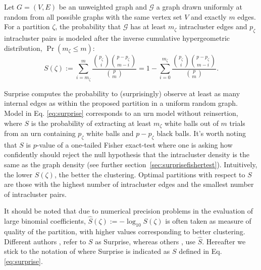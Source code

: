 Let $G=(V,E)$ be an unweighted graph and $\mathcal{G}$ a graph drawn uniformly at random from all possible graphs with the same vertex set $V$ and exactly $m$ edges. For a partition $\zeta$, the probability that $\mathcal{G}$ has at least $m_\zeta$ intracluster edges and $p_\zeta$ intracluster pairs is modeled after the inverse cumulative hypergeometric distribution, $\Pr( m_\zeta \leq m)$:
\begin{equation}\label{eq:surprise}
S(\zeta) := \sum_{i = m_\zeta}^m \dfrac{\binom{p_\zeta}{i} \binom{p-p_\zeta}{m-i} }{\binom{p}{m}} = 1- \sum_{i = 0}^{m_\zeta} \dfrac{\binom{p_\zeta}{i} \binom{p-p_\zeta}{m-i} }{\binom{p}{m}}.
\end{equation}

Surprise computes the probability to (surprisingly) observe at least as many internal edges as within the proposed partition in a uniform random graph. Model in Eq. \ref{eq:surprise}  corresponds to an urn model without reinsertion, where $S$ is the probability of extracting at least $m_\zeta$ white balls out of $m$ trials from an urn containing $p_\zeta$ white balls and $p-p_\zeta$ black balls. It's worth noting that $S$ is $p$-value of a one-tailed Fisher exact-test where one is asking how confidently should reject the null hypothesis that the intracluster density is the same as the graph density (see further section~\ref{sec:surprisefishertest}). Intuitively, the lower $S(\zeta)$, the better the clustering. Optimal partitions with respect to $S$ are those with the highest number of intracluster edges and the smallest number of intracluster pairs.

It should be noted that due to numerical precision problems in the evaluation of large binomial coefficients, $\hat{S}(\zeta) := -\log_{10}S(\zeta)$ is often taken as measure of quality of the partition, with higher values corresponding to better clustering. Different authors \cite{arnauVMarsS2005}, \cite{fleck2014} refer to $S$ as Surprise, whereas others \cite{aldecoa2011}, \cite{Aldecoa2013} use $\hat{S}$. Hereafter we stick to the notation of \cite{fleck2014} where Surprise is indicated as $S$ defined in Eq. \ref{eq:surprise}.


